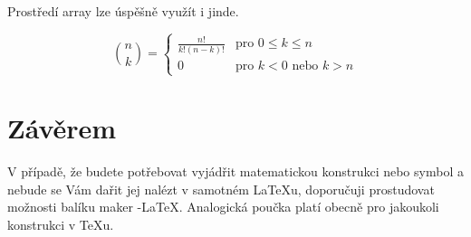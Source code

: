 \documentclass[a4paper,11pt,twocolumn]{article}
\theoremstyle{definition}
\theoremstyle{plain}
\begin{document}
Prostředí array lze úspěšně využít i jinde.

$$\binom{n}{k} = \left\{ \begin{array}{ll}
  \frac{n!}{k!(n-k)!} & \mbox{pro $0 \le k \le n$}  \\
  0 & \mbox{pro $k < 0$ nebo $k > n$} \end{array} \right. $$

\section{Závěrem}

V případě, že budete potřebovat vyjádřit matematickou konstrukci nebo symbol a nebude se Vám dařit jej nalézt v samotném \LaTeX u, doporučuji prostudovat možnosti balíku maker \AmS-\LaTeX .
Analogická poučka platí obecně pro jakoukoli konstrukci v \TeX u.
\end{document}
